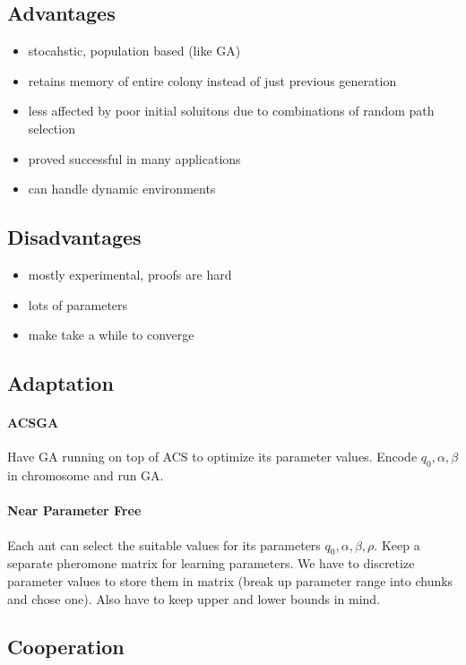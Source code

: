 \documentclass[12pt]{article}
\begin{document}
\subsection*{Advantages}
\begin{itemize}
	\item stocahstic, population based (like GA)
	\item retains memory of entire colony instead of just previous generation
	\item less affected by poor initial soluitons due to combinations of random path selection
	\item proved successful in many applications
	\item can handle dynamic environments
\end{itemize}

\subsection*{Disadvantages}
\begin{itemize}
	\item mostly experimental, proofs are hard
	\item lots of parameters
	\item make take a while to converge
\end{itemize}

\subsection*{Adaptation}
\paragraph{ACSGA} 
\label{par:acsga}
Have GA running on top of ACS to optimize its parameter values. Encode $q_0, \alpha, \beta$ in chromosome and run GA.

\paragraph{Near Parameter Free} 
\label{par:near_parameter_free}
Each ant can select the suitable values for its parameters $q_0, \alpha, \beta, \rho$. Keep a separate pheromone matrix for learning parameters. We have to discretize parameter values to store them in matrix (break up parameter range into chunks and chose one). Also have to keep upper and lower bounds in mind.

\subsection*{Cooperation}
\label{sub:cooperation}
\end{document}
